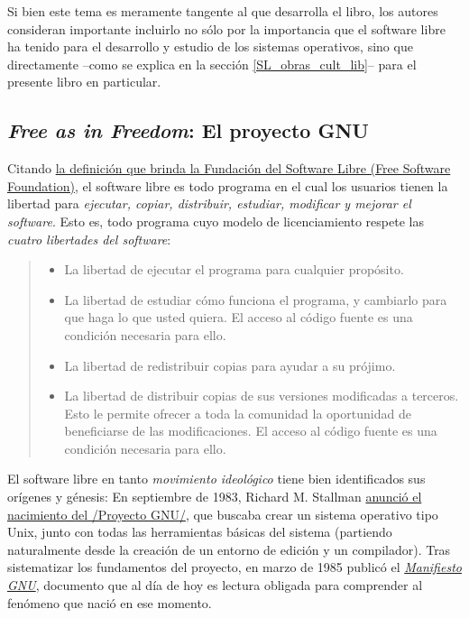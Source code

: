 \documentclass[11pt,fleqn]{book} %
\begin{document}
Si bien este tema es meramente tangente al que desarrolla el libro,
los autores consideran importante incluirlo no sólo por la importancia
que el software libre ha tenido para el desarrollo y estudio de los
sistemas operativos, sino que directamente –como se explica en la
sección \ref{SL_obras_cult_lib}– para el presente libro en
particular.
\subsection{\emph{Free as in Freedom}: El proyecto GNU}
\label{sec-8-1-1}


Citando \href{https://www.gnu.org/philosophy/free-sw.es.html}{la definición que brinda la Fundación del Software Libre (Free Software Foundation)}, el software libre es todo programa en el cual
los usuarios tienen la libertad para \emph{ejecutar, copiar, distribuir, estudiar, modificar y mejorar el software}. Esto es, todo programa
cuyo modelo de licenciamiento respete las \emph{cuatro libertades del software}:

\begin{quote}
\begin{itemize}
\item La libertad de ejecutar el programa para cualquier propósito.
\item La libertad de estudiar cómo funciona el programa, y cambiarlo para
  que haga lo que usted quiera. El acceso al código fuente es una
  condición necesaria para ello.
\item La libertad de redistribuir copias para ayudar a su prójimo.
\item La libertad de distribuir copias de sus versiones modificadas a
  terceros. Esto le permite ofrecer a toda la comunidad la oportunidad
  de beneficiarse de las modificaciones. El acceso al código fuente es
  una condición necesaria para ello.
\end{itemize}

\end{quote}

El software libre en tanto \emph{movimiento ideológico} tiene bien
identificados sus orígenes y génesis: En septiembre de 1983, Richard
M. Stallman \href{https://www.gnu.org/gnu/gnu-history.html}{anunció el nacimiento del /Proyecto GNU/}, que buscaba
crear un sistema operativo tipo Unix, junto con todas las herramientas
básicas del sistema (partiendo naturalmente desde la creación de un
entorno de edición y un compilador).  Tras sistematizar los
fundamentos del proyecto, en marzo de 1985 publicó el \emph{\href{https://www.gnu.org/gnu/manifesto.html}{Manifiesto GNU}}, documento que al día de hoy es lectura obligada para comprender
al fenómeno que nació en ese momento.
\end{document}
